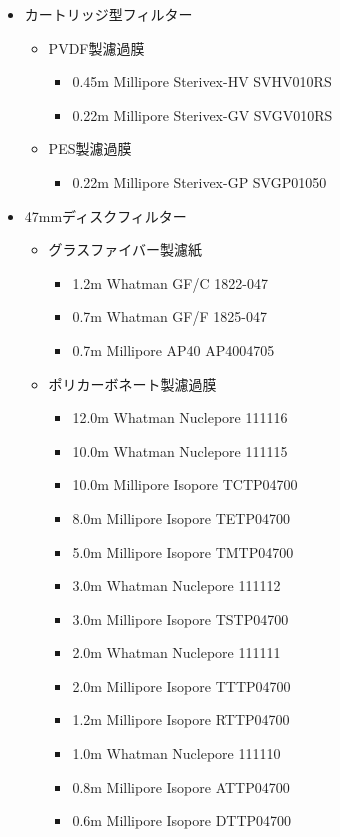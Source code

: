 \documentclass[titlepage,10pt,a4paper,uplatex]{jsbook}
\begin{document}
\begin{itemize}
\item カートリッジ型フィルター
\begin{itemize}
\item PVDF製濾過膜
\begin{itemize}
\item 0.45{\textmu}m Millipore Sterivex-HV SVHV010RS
\item 0.22{\textmu}m Millipore Sterivex-GV SVGV010RS
\end{itemize}
\item PES製濾過膜
\begin{itemize}
\item 0.22{\textmu}m Millipore Sterivex-GP SVGP01050
\end{itemize}
\end{itemize}
\item 47mmディスクフィルター
\begin{itemize}
\item グラスファイバー製濾紙
\begin{itemize}
\item 1.2{\textmu}m Whatman GF/C 1822-047
\item 0.7{\textmu}m Whatman GF/F 1825-047
\item 0.7{\textmu}m Millipore AP40 AP4004705
\end{itemize}
\item ポリカーボネート製濾過膜
\begin{itemize}
\item 12.0{\textmu}m Whatman Nuclepore 111116
\item 10.0{\textmu}m Whatman Nuclepore 111115
\item 10.0{\textmu}m Millipore Isopore TCTP04700
\item 8.0{\textmu}m Millipore Isopore TETP04700
\item 5.0{\textmu}m Millipore Isopore TMTP04700
\item 3.0{\textmu}m Whatman Nuclepore 111112
\item 3.0{\textmu}m Millipore Isopore TSTP04700
\item 2.0{\textmu}m Whatman Nuclepore 111111
\item 2.0{\textmu}m Millipore Isopore TTTP04700
\item 1.2{\textmu}m Millipore Isopore RTTP04700
\item 1.0{\textmu}m Whatman Nuclepore 111110
\item 0.8{\textmu}m Millipore Isopore ATTP04700
\item 0.6{\textmu}m Millipore Isopore DTTP04700

\end{itemize}
\end{itemize}
\end{itemize}
\end{document}
